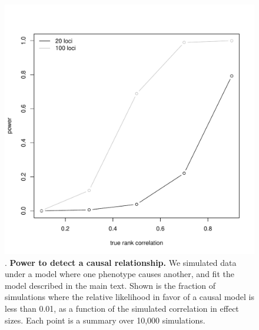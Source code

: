 \documentclass[11pt,titlepage]{article}
\begin{document}
\begin{figure}
\begin{center}
\includegraphics[scale = 0.5]{figs/power_mrmr.pdf}
\caption{. \textbf{Power to detect a causal relationship.} We simulated data under a model where one phenotype causes another, and fit the model described in the main text. Shown is the fraction of simulations where the relative likelihood in favor of a causal model is less than 0.01, as a function of the simulated correlation in effect sizes. Each point is a summary over 10,000 simulations.}\label{f_causal_power}
\end{center}
\end{figure}
\end{document}
